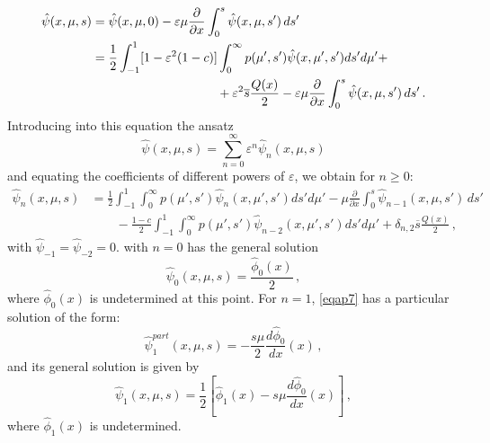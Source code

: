 \documentclass[12pt]{article}
\newcommand{\eps}{\varepsilon}
\begin{document}
{\begin{align}
      \hat\psi( x, \mu, s)  &= \hat\psi(x,\mu, 0) - \varepsilon \mu\frac{\partial}{\partial x} \int_0^s \hat\psi(x, \mu, s') \, ds' \\
      & = \frac{1}{2}\int_{-1}^1 [1-\eps^2(1-c)] \int_0^{\infty} p(\mu',s')
\hat\psi(x, \mu', s') ds' d\mu' + \nonumber\\
         &\hspace{3.5cm} + \varepsilon^2 \overline{s} \frac{Q(x)}{2} - \varepsilon \mu\frac{\partial}{\partial x} \int_0^s \hat\psi(x, \mu, s') \, ds' \,.\nonumber
   \end{align}
Introducing into this equation the ansatz 
   \begin{equation}
 \hat\psi(x, \mu, s) =  \sum_{n=0}^{\infty} \varepsilon^n
       \hat\psi_n(x, \mu, s) 
       \end{equation}
and equating the coefficients of different powers of $\varepsilon$, we obtain for $n \ge 0$:
   \begin{align}\label{eqap7}
\hat\psi_n(x,\mu, s) &= \frac{1}{2}\int_{-1}^1 \int_0^{\infty} p(\mu',s')
\hat\psi_n(x, \mu', s') ds' d\mu'  - \mu\frac{\partial}{\partial x} \int_0^s \hat\psi_{n-1}(x, \mu, s') \, ds' \\
& \quad\quad -\frac{1-c}{2}\int_{-1}^1 \int_0^{\infty} p(\mu',s')
\hat\psi_{n-2}(x, \mu', s') ds' d\mu' + \delta_{n,2} \overline{s} \frac{Q( x)}{2} \,, 
   \nonumber
   \end{align}
with $\hat\psi_{-1}=\hat\psi_{-2}=0$.
 with $n=0$ has the general solution
   \begin{equation}
      \hat\psi_0(x, \mu, s) = \frac{\hat\phi_0(x)}{2} \,,
   \end{equation}
where $\hat\phi_0(x)$ is undetermined at this point.
For $n=1$, \cref{eqap7} has a particular solution of the form:
    \begin{equation}
      \hat\psi^{part}_1(x, \mu, s) = - \frac{s\mu}{2}\frac{d \hat\phi_0}{d x}(x) \,,
   \end{equation}   
and its general solution is given by 
   \begin{equation}
      \hat\psi_1( x, \mu, s) =  \frac{1}{2}\left[\hat\phi_1( x) - s\mu\frac{d \hat\phi_0}{d x}(x)\right] \,,
  \end{equation}  
where $\hat\phi_1(x)$ is undetermined.

}
\end{document}
